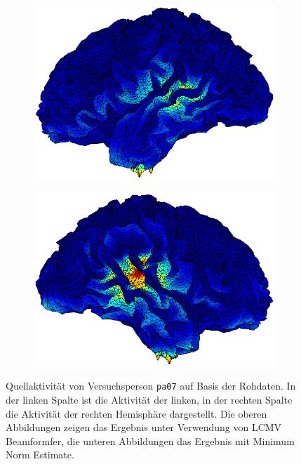 \documentclass[doc,a4paper,12pt]{apa6}
\begin{document}
\begin{figure}
  \vspace*{0.04\textwidth}
  \begin{subfigure}[c]{0.47\textwidth}
    \includegraphics[width=\textwidth]{ergebnisse/activity/pa07_eve2_raw_mne_activity_left.eps}
    \label{img:activity-latera:mne:left}
  \end{subfigure}\hspace*{0.04\textwidth}
  \begin{subfigure}[c]{0.47\textwidth}
    \includegraphics[width=\textwidth]{ergebnisse/activity/pa07_eve2_raw_mne_activity_right.eps}
    \label{img:activity-latera:mne:right}
  \end{subfigure}
  \captionsetup{justification=justified}
  \caption[Quellaktivität von Versuchsperson \texttt{pa07} auf Basis der Rohdaten]{Quellaktivität von Versuchsperson \texttt{pa07} auf Basis der Rohdaten. In der linken Spalte ist die Aktivität der linken, in der rechten Spalte die Aktivität der rechten Hemisphäre dargestellt. Die oberen Abbildungen zeigen das Ergebnis unter Verwendung von LCMV Beamformfer, die unteren Abbildungen das Ergebnis mit Minimum Norm Estimate.}
  \label{img:activity-lateral}
\end{figure}
\end{document}
